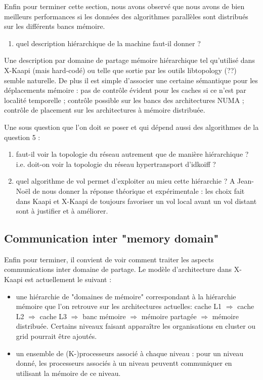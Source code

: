 \documentclass[12pt]{report}
\begin{document}
Enfin pour terminer cette section, nous avons observé que nous avons de bien meilleurs performances si les données des algorithmes parallèles sont distribués sur les différents bancs mémoire.
\begin{enumerate}[label=\textbf{Q \theenumi.},ref=\textbf{Q \theenumi},resume]
	\item quel description hiérarchique de la machine faut-il donner ?
\end{enumerate}
Une description par domaine de partage mémoire hiérarchique tel qu'utilisé dans X-Kaapi (mais hard-codé) ou telle que sortie par les outils libtopology (??) semble naturelle. De plus il est simple d'associer une certaine sémantique pour les déplacements mémoire : pas de contrôle évident pour les caches si ce n'est par localité temporelle ; contrôle possible sur les bancs des architectures NUMA ; contrôle de placement sur les architectures à mémoire distribuée.

Une sous question que l'on doit se poser et qui dépend aussi des algorithmes de la question 5 : 
\begin{enumerate}[label=\textbf{Q \theenumi.},ref=\textbf{Q \theenumi},resume]
	\item faut-il voir la topologie du réseau autrement que de manière hiérarchique ? i.e. doit-on voir la topologie du réseau hypertransport d'idkoiff ?

	\item quel algorithme de vol permet d'exploiter au mieu cette hiérarchie ?
A Jean-Noël de nous donner la réponse théorique et expérimentale : les choix fait dans Kaapi et X-Kaapi de toujours favoriser un vol local avant un vol distant sont à justifier et à améliorer.
\end{enumerate}




\subsection{Communication inter "memory domain"}
Enfin pour terminer, il convient de voir comment traiter les aspects communications inter domaine de partage.
Le modèle d'architecture dans X-Kaapi est actuellement le suivant :
\begin{itemize}
	\item une hiérarchie de "domaines de mémoire" correspondant à la hiérarchie mémoire que l'on retrouve sur les architectures actuelles: cache L1 $\Rightarrow$ cache L2 $\Rightarrow$ cache L3 $\Rightarrow$ banc mémoire $\Rightarrow$ mémoire partagée $\Rightarrow$ mémoire distribuée. Certains niveaux faisant apparaître les organisations en cluster ou grid pourrait être ajoutés.
	\item un ensemble de (K-)processeurs associé à chaque niveau : pour un niveau donné,  les processeurs associés à un niveau peuventt communiquer en utilisant la mémoire de ce niveau.
\end{itemize}
\end{document}

